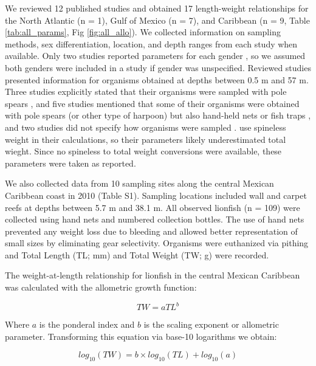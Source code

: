\documentclass[12pt,]{article}
\theoremstyle{definition}
\theoremstyle{definition}
\theoremstyle{definition}
\theoremstyle{remark}
\begin{document}
We reviewed 12 published studies and obtained 17 length-weight
relationships for the North Atlantic (n = 1), Gulf of Mexico (n = 7),
and Caribbean (n = 9, Table \ref{tab:all_params}, Fig
\ref{fig:all_allo}). We collected information on sampling methods, sex
differentiation, location, and depth ranges from each study when
available. Only two studies reported parameters for each gender
\citep{aguilarperera_2016,fogg_2013}, so we assumed both genders were
included in a study if gender was unspecified. Reviewed studies
presented information for organisms obtained at depths between 0.5 m and
57 m. Three studies explicitly stated that their organisms were sampled
with pole spears
\citep{dahl_2014,aguilarperera_2016,chin_2016,sabidoitz_2016}, and five
studies mentioned that some of their organisms were obtained with pole
spears (or other type of harpoon) but also hand-held nets or fish traps
\citep{barbour_2011,fogg_2013,edwards_2014,toledohernndez_2014,sandel_2015,sabidoitza_2016,sabidoitz_2016},
and two studies did not specify how organisms were sampled
\citep{darling_2011,deleon_2013}. \citet{fogg_2013} use spineless weight
in their calculations, so their parameters likely underestimated total
wieght. Since no spineless to total weight conversions were available,
these parameters were taken as reported.

We also collected data from 10 sampling sites along the central Mexican
Caribbean coast in 2010 (Table S1). Sampling locations included wall and
carpet reefs at depths between 5.7 m and 38.1 m. All observed lionfish
(n = 109) were collected using hand nets and numbered collection
bottles. The use of hand nets prevented any weight loss due to bleeding
and allowed better representation of small sizes by eliminating gear
selectivity. Organisms were euthanized via pithing and Total Length (TL;
mm) and Total Weight (TW; g) were recorded.

The weight-at-length relationship for lionfish in the central Mexican
Caribbean was calculated with the allometric growth function:

\begin{equation}
\label{eq:allometric}
TW = aTL^b
\end{equation}

Where \(a\) is the ponderal index and \(b\) is the scaling exponent or
allometric parameter. Transforming this equation via base-10 logarithms
we obtain:

\begin{equation}
\label{eq:log-alo}
log_{10}(TW) = b\times log_{10}(TL) + log_{10}(a)
\end{equation}
\end{document}
